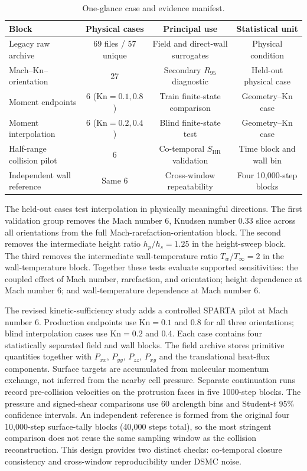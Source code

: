 \documentclass[aip,pof,preprint,floatfix,amsmath,amssymb]{revtex4-2}
\newcommand{\Kn}{\mathrm{Kn}}
\begin{document}
\begin{table}[h]
\centering
\caption{One-glance case and evidence manifest.}
\label{tab:evidence_manifest}
\small
\begin{tabular}{lccc}
\toprule
Block & Physical cases & Principal use & Statistical unit \\
\midrule
Legacy raw archive & 69 files / 57 unique & Field and direct-wall surrogates & Physical condition \\
Mach--$\Kn$--orientation & 27 & Secondary $R_{95}$ diagnostic & Held-out physical case \\
Moment endpoints & 6 ($\Kn=0.1,0.8$) & Train finite-state comparison & Geometry--$\Kn$ case \\
Moment interpolation & 6 ($\Kn=0.2,0.4$) & Blind finite-state test & Geometry--$\Kn$ case \\
Half-range collision pilot & 6 & Co-temporal $S_{\mathrm{HR}}$ validation & Time block and wall bin \\
Independent wall reference & Same 6 & Cross-window repeatability & Four 10,000-step blocks \\
\bottomrule
\end{tabular}
\end{table}


The held-out cases test interpolation in physically meaningful directions. The first validation group removes the Mach number $6$, Knudsen number $0.33$ slice across all orientations from the full Mach-rarefaction-orientation block. The second removes the intermediate height ratio $h_p/h_s=1.25$ in the height-sweep block. The third removes the intermediate wall-temperature ratio $T_w/T_\infty=2$ in the wall-temperature block. Together these tests evaluate supported sensitivities: the coupled effect of Mach number, rarefaction, and orientation; height dependence at Mach number $6$; and wall-temperature dependence at Mach number $6$.

The revised kinetic-sufficiency study adds a controlled SPARTA pilot at Mach number 6. Production endpoints use $\Kn=0.1$ and 0.8 for all three orientations; blind interpolation cases use $\Kn=0.2$ and 0.4. Each case contains four statistically separated field and wall blocks. The field archive stores primitive quantities together with $P_{xx}$, $P_{yy}$, $P_{zz}$, $P_{xy}$ and the translational heat-flux components. Surface targets are accumulated from molecular momentum exchange, not inferred from the nearby cell pressure. Separate continuation runs record pre-collision velocities on the protrusion faces in five 1000-step blocks. The pressure and signed-shear comparisons use 60 arclength bins and Student-$t$ 95\% confidence intervals. An independent reference is formed from the original four 10,000-step surface-tally blocks (40,000 steps total), so the most stringent comparison does not reuse the same sampling window as the collision reconstruction. This design provides two distinct checks: co-temporal closure consistency and cross-window reproducibility under DSMC noise.
\end{document}
